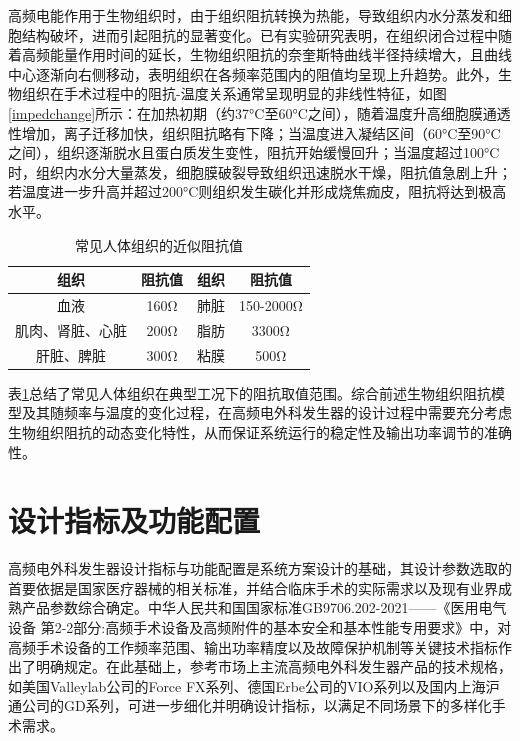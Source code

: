 高频电能作用于生物组织时，由于组织阻抗转换为热能，导致组织内水分蒸发和细胞结构破坏，进而引起阻抗的显著变化。已有实验研究表明，在组织闭合过程中随着高频能量作用时间的延长，生物组织阻抗的奈奎斯特曲线半径持续增大，且曲线中心逐渐向右侧移动，表明组织在各频率范围内的阻值均呈现上升趋势\cite{YanBoWen_dianwaikeshepinnengliangfashengqikongzhixitongdeyanzhi_2014}。此外，生物组织在手术过程中的阻抗-温度关系通常呈现明显的非线性特征，如图\ref{impedchange}所示：在加热初期（约37°C至60°C之间），随着温度升高细胞膜通透性增加，离子迁移加快，组织阻抗略有下降；当温度进入凝结区间（60°C至90°C之间），组织逐渐脱水且蛋白质发生变性，阻抗开始缓慢回升；当温度超过100°C时，组织内水分大量蒸发，细胞膜破裂导致组织迅速脱水干燥，阻抗值急剧上升；若温度进一步升高并超过200°C则组织发生碳化并形成烧焦痂皮，阻抗将达到极高水平。

\begin{table}[htbp]
    \caption{\label{imped}常见人体组织的近似阻抗值}
    \centering
    \small
    \setlength{\tabcolsep}{20pt}
	\begin{tabular}{ c c c c }
        \hline
        组织 & 阻抗值 & 组织 & 阻抗值\\
        \hline
        血液            &  160Ω  & 肺脏 &  150-2000Ω\\
        肌肉、肾脏、心脏  &  200Ω  & 脂肪 &  3300Ω\\
        肝脏、脾脏     &  300Ω    & 粘膜 & 500Ω\\
        \hline
    \end{tabular}
\end{table}

表\ref{imped}总结了常见人体组织在典型工况下的阻抗取值范围。综合前述生物组织阻抗模型及其随频率与温度的变化过程，在高频电外科发生器的设计过程中需要充分考虑生物组织阻抗的动态变化特性，从而保证系统运行的稳定性及输出功率调节的准确性。

\section{设计指标及功能配置}
高频电外科发生器设计指标与功能配置是系统方案设计的基础，其设计参数选取的首要依据是国家医疗器械的相关标准，并结合临床手术的实际需求以及现有业界成熟产品参数综合确定。中华人民共和国国家标准GB9706.202-2021——《医用电气设备 第2-2部分:高频手术设备及高频附件的基本安全和基本性能专用要求》中，对高频手术设备的工作频率范围、输出功率精度以及故障保护机制等关键技术指标作出了明确规定\cite{GB97062022021YiYongDianQiSheBeiDi222021}。在此基础上，参考市场上主流高频电外科发生器产品的技术规格，如美国Valleylab公司的Force FX系列、德国Erbe公司的VIO系列以及国内上海沪通公司的GD系列，可进一步细化并明确设计指标，以满足不同场景下的多样化手术需求。

